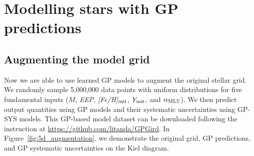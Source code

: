 

\section{Modelling stars with GP predictions}\label{sec:augmentation}


\subsection{Augmenting the model grid}

Now we are able to use learned GP models to augment the original stellar grid. We randomly sample 5,000,000 data points with uniform distributions for five fundamental inputs ($M$, {\it EEP}, {\it [Fe/H]}$_{\rm init}$, $Y_{\rm init}$, and $\alpha_{\rm MLT}$). We then predict output quantities using GP models and their systematic uncertainties using GP-SYS models. This GP-based model dataset can be downloaded following the instruction at \url{https://github.com/litanda/GPGird}. In Figure~\ref{fig:5d_augmentation}, we demonstrate the original grid, GP predictions, and GP systematic uncertainties on the Kiel diagram. 

